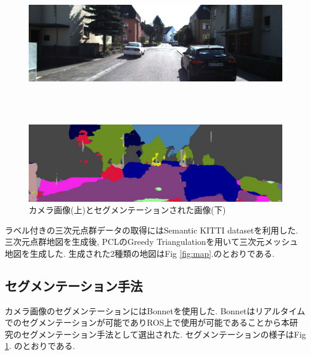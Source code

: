 \documentclass[letterpaper, 9 pt, conference]{ieeeconf}
\begin{document}
\begin{figure}[htbp]
 \begin{minipage}[b]{1.0\hsize}
 \begin{center}
  \includegraphics[keepaspectratio, scale=0.19]{./picture/bgrimage8.jpg}
  \end{center}
 \end{minipage} \\ \\
 \begin{minipage}[b]{1.0\hsize}
 \begin{center}
  \includegraphics[keepaspectratio, scale=0.19]{./picture/segimage8.jpg}
  \end{center}
 \end{minipage}
 \caption{カメラ画像(上)とセグメンテーションされた画像(下)}\label{fig:seg}
\end{figure}

ラベル付きの三次元点群データの取得にはSemantic KITTI dataset\cite{semantic_kitti_dataset_paper}を利用した. 三次元点群地図を生成後, PCLのGreedy Triangulation\cite{PCL_Triangulation}を用いて三次元メッシュ地図を生成した. 生成された2種類の地図はFig \ref{fig:map}.のとおりである.

\subsection{セグメンテーション手法}
カメラ画像のセグメンテーションにはBonnet\cite{milioto2019icra}を使用した. Bonnetはリアルタイムでのセグメンテーションが可能でありROS上で使用が可能であることから本研究のセグメンテーション手法として選出された. セグメンテーションの様子はFig \ref{fig:seg}. のとおりである.
\end{document}
